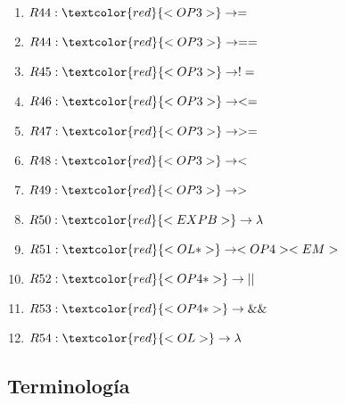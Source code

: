 \documentclass{article}
\begin{document}
\begin{enumerate}
\item $R44:     \textcolor{red}{<OP3>}        \rightarrow  = $
\item $R44:     \textcolor{red}{<OP3>}        \rightarrow  == $
\item $R45:     \textcolor{red}{<OP3>}        \rightarrow  != $
\item $R46:     \textcolor{red}{<OP3>}        \rightarrow  <= $
\item $R47:     \textcolor{red}{<OP3>}        \rightarrow  >= $
\item $R48:     \textcolor{red}{<OP3>}        \rightarrow  < $
\item $R49:     \textcolor{red}{<OP3>}        \rightarrow  > $
\item $R50:     \textcolor{red}{<EXPB>}        \rightarrow   \lambda $
\item $R51:     \textcolor{red}{<OL*> }       \rightarrow   <OP4><EM> $
\item $R52:    \textcolor{red}{ <OP4*>}        \rightarrow   || $
\item $R53:     \textcolor{red}{<OP4*>}        \rightarrow   \&\& $
\item $R54:    \textcolor{red}{<OL>}        \rightarrow   \lambda $
\end{enumerate}

\subsection*{Terminología}
\end{document}
